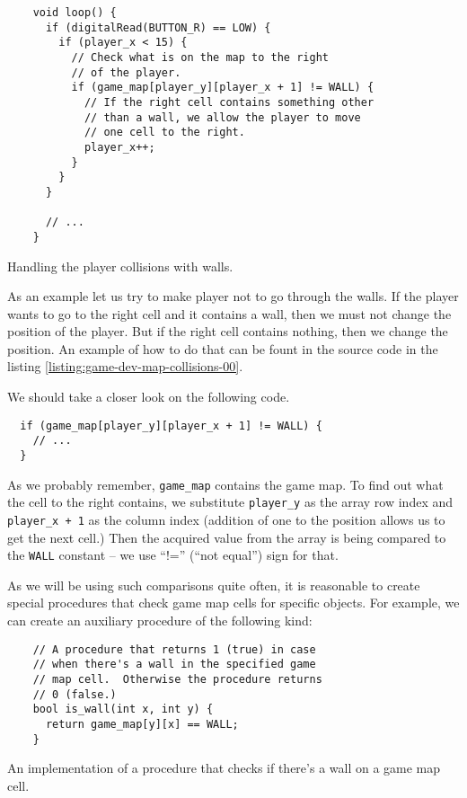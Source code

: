 \documentclass[../sparc.tex]{subfiles}
\begin{document}
\begin{listing}[H]
  \begin{verbatim}
    void loop() {
      if (digitalRead(BUTTON_R) == LOW) {
        if (player_x < 15) {
          // Check what is on the map to the right
          // of the player.
          if (game_map[player_y][player_x + 1] != WALL) {
            // If the right cell contains something other
            // than a wall, we allow the player to move
            // one cell to the right.
            player_x++;
          }
        }
      }

      // ...
    }
  \end{verbatim}
  \caption{Handling the player collisions with walls.}
  \label{listing:game-dev-map-collisions-00}
\end{listing}

As an example let us try to make player not to go through the walls.  If the
player wants to go to the right cell and it contains a wall, then we must not
change the position of the player.  But if the right cell contains nothing, then
we change the position.  An example of how to do that can be fount in the source
code in the listing \ref{listing:game-dev-map-collisions-00}.

We should take a closer look on the following code.

\begin{verbatim}
  if (game_map[player_y][player_x + 1] != WALL) {
    // ...
  }
\end{verbatim}

As we probably remember, \texttt{game_map} contains the game map.  To
find out what the cell to the right contains, we substitute
\texttt{player_y} as the array row index and \texttt{player_x
  + 1} as the column index (addition of one to the position allows us to get the
next cell.)  Then the acquired value from the array is being compared to the
\texttt{WALL} constant -- we use ``!='' (``not equal'') sign for that.

As we will be using such comparisons quite often, it is reasonable to create
special procedures that check game map cells for specific objects.  For example,
we can create an auxiliary procedure of the following kind:

\begin{listing}[H]
  \begin{verbatim}
    // A procedure that returns 1 (true) in case
    // when there's a wall in the specified game
    // map cell.  Otherwise the procedure returns
    // 0 (false.)
    bool is_wall(int x, int y) {
      return game_map[y][x] == WALL;
    }
  \end{verbatim}
  \caption{An implementation of a procedure that checks if there's a wall on a
    game map cell.}
  \label{listing:game-dev-map-collisions-01}
\end{listing}
\end{document}
